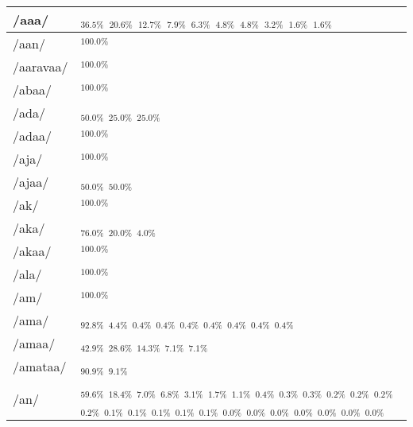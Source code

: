 \documentclass{article}
\begin{document}
\begin{longtable}{|l|p{}|}
/aaa/ & \textIndus{}$_{36.5\%}$ \quad \textIndus{}$_{20.6\%}$ \quad \textIndus{}$_{12.7\%}$ \quad \textIndus{}$_{7.9\%}$ \quad \textIndus{}$_{6.3\%}$ \quad \textIndus{}$_{4.8\%}$ \quad \textIndus{}$_{4.8\%}$ \quad \textIndus{}$_{3.2\%}$ \quad \textIndus{}$_{1.6\%}$ \quad \textIndus{}$_{1.6\%}$ \\ \hline
/aan/ & \textIndus{}$_{100.0\%}$ \\ \hline
/aaravaa/ & \textIndus{}$_{100.0\%}$ \\ \hline
/abaa/ & \textIndus{}$_{100.0\%}$ \\ \hline
/ada/ & \textIndus{}$_{50.0\%}$ \quad \textIndus{}$_{25.0\%}$ \quad \textIndus{}$_{25.0\%}$ \\ \hline
/adaa/ & \textIndus{}$_{100.0\%}$ \\ \hline
/aja/ & \textIndus{}$_{100.0\%}$ \\ \hline
/ajaa/ & \textIndus{}$_{50.0\%}$ \quad \textIndus{}$_{50.0\%}$ \\ \hline
/ak/ & \textIndus{}$_{100.0\%}$ \\ \hline
/aka/ & \textIndus{}$_{76.0\%}$ \quad \textIndus{}$_{20.0\%}$ \quad \textIndus{}$_{4.0\%}$ \\ \hline
/akaa/ & \textIndus{}$_{100.0\%}$ \\ \hline
/ala/ & \textIndus{}$_{100.0\%}$ \\ \hline
/am/ & \textIndus{}$_{100.0\%}$ \\ \hline
/ama/ & \textIndus{}$_{92.8\%}$ \quad \textIndus{}$_{4.4\%}$ \quad \textIndus{}$_{0.4\%}$ \quad \textIndus{}$_{0.4\%}$ \quad \textIndus{}$_{0.4\%}$ \quad \textIndus{}$_{0.4\%}$ \quad \textIndus{}$_{0.4\%}$ \quad \textIndus{}$_{0.4\%}$ \quad \textIndus{}$_{0.4\%}$ \\ \hline
/amaa/ & \textIndus{}$_{42.9\%}$ \quad \textIndus{}$_{28.6\%}$ \quad \textIndus{}$_{14.3\%}$ \quad \textIndus{}$_{7.1\%}$ \quad \textIndus{}$_{7.1\%}$ \\ \hline
/amataa/ & \textIndus{}$_{90.9\%}$ \quad \textIndus{}$_{9.1\%}$ \\ \hline
/an/ & \textIndus{}$_{59.6\%}$ \quad \textIndus{}$_{18.4\%}$ \quad \textIndus{}$_{7.0\%}$ \quad \textIndus{}$_{6.8\%}$ \quad \textIndus{}$_{3.1\%}$ \quad \textIndus{}$_{1.7\%}$ \quad \textIndus{}$_{1.1\%}$ \quad \textIndus{}$_{0.4\%}$ \quad \textIndus{}$_{0.3\%}$ \quad \textIndus{}$_{0.3\%}$ \quad \textIndus{}$_{0.2\%}$ \quad \textIndus{}$_{0.2\%}$ \quad \textIndus{}$_{0.2\%}$ \quad \textIndus{}$_{0.2\%}$ \quad \textIndus{}$_{0.1\%}$ \quad \textIndus{}$_{0.1\%}$ \quad \textIndus{}$_{0.1\%}$ \quad \textIndus{}$_{0.1\%}$ \quad \textIndus{}$_{0.1\%}$ \quad \textIndus{}$_{0.0\%}$ \quad \textIndus{}$_{0.0\%}$ \quad \textIndus{}$_{0.0\%}$ \quad \textIndus{}$_{0.0\%}$ \quad \textIndus{}$_{0.0\%}$ \quad \textIndus{}$_{0.0\%}$ \quad \textIndus{}$_{0.0\%}$ \\ \hline

\end{longtable}
\end{document}
